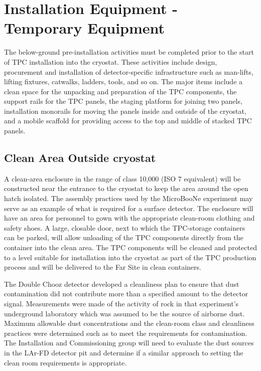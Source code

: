 \section{Installation Equipment - Temporary Equipment}
\label{fd:install:tempeqp}

The below-ground pre-installation activities must be completed prior to the start of TPC installation into the cryostat. These activities include design, procurement and installation of detector-specific 
infrastructure such as man-lifts, lifting fixtures, catwalks, ladders, tools, and so on. The major items include a clean space for the unpacking and preparation of the TPC components, the support rails for the 
TPC panels, the staging platform for joining two panels, installation monorails for moving the panels inside and outside of the cryostat, and a mobile scaffold for providing access to 
the top and middle of stacked TPC panels. 

\subsection{Clean Area Outside cryostat}
\label{fd:install:tempeqp:cleanarea}

A clean-area enclosure in the range of class 10,000 (ISO 7 equivalent) will be constructed near the entrance to the cryostat to keep the area around the open hatch isolated. The assembly practices used by 
the MicroBooNe experiment may serve as an example of what is required for a surface detector. The enclosure will have an area for personnel to gown with the appropriate clean-room clothing and safety 
shoes. A large, closable door, next to which the TPC-storage containers can be parked, will allow unloading of the TPC components directly from the container into the clean area. The TPC components 
will be cleaned and protected to a level suitable for installation into the cryostat as part of the TPC production process and will be delivered to the Far Site in clean containers. 

The Double Chooz detector developed a cleanliness plan to ensure that dust contamination did not contribute more than a specified amount to the detector signal. Measurements were made of the activity 
of rock in that experiment’s underground laboratory which was assumed to be the source of airborne dust. Maximum allowable dust concentrations and the clean-room class and cleanliness practices were 
determined such as to meet the requirements for contamination. The Installation and Commissioning group will need to evaluate the dust sources in the LAr-FD detector pit and determine if a similar 
approach to setting the clean room requirements is appropriate. 

